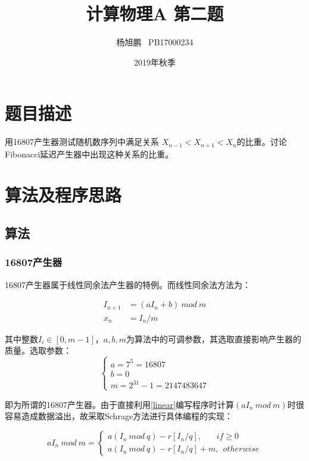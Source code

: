 \documentclass[a4paper,11pt]{article}
\author{ 杨旭鹏  \  PB17000234}
\date{2019年秋季}
\title{计算物理A 第二题}
\begin{document}
\maketitle

\section{题目描述}
用16807产生器测试随机数序列中满足关系 $X_{n-1} < X_{n+1} < X_{n}$的比重。讨论Fibonacci延迟产生器中出现这种关系的比重。

\section{算法及程序思路}
\subsection{算法}
\subsubsection{16807产生器}
16807产生器属于线性同余法产生器的特例。而线性同余法方法为：

\begin{equation}
\begin{aligned}
	I_{n+1} &= (aI_{n} + b) \ mod \ m \\
	x_{n} &= I_{n}/m
\end{aligned}
\label{linear}	
\end{equation}

其中整数$I_{i} \in [0,m-1]$，$a,b,m$为算法中的可调参数，其选取直接影响产生器的质量。选取参数：
\begin{equation}
\left\{
\begin{array}{l}
	a = 7^{5} = 16807 \\
	b = 0 \\
	m = 2^{31}-1 = 2147483647
\end{array}
\right.
\end{equation}

即为所谓的16807产生器。由于直接利用\ref{linear}编写程序时计算$(aI_{n} \ mod \ m )$时很容易造成数据溢出，故采取Schrage方法进行具体编程的实现：

\begin{equation}
	aI_{n} \ mod \ m = \left\{
	\begin{array}{l}
		a(I_{n}\ mod \ q) - r[I_{n}/q],\ \ \ \ \ \ \ \ if \geq 0 \\
		a(I_{n}\ mod \ q) - r[I_{n}/q] + m,\ \ otherwise	
			\end{array}
	\right.
\end{equation}
\end{document}
